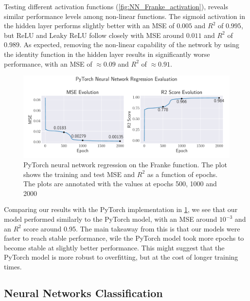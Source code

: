 \documentclass[aps,pra,english,notitlepage,reprint,nofootinbib]{revtex4-1}  %
\begin{document}
Testing different activation functions (\cref{fig:NN_Franke_activation}), reveals similar performance levels among non-linear functions. The sigmoid activation in the hidden layer performs slightly better with an MSE of $0.005$ and $R^2$ of $0.995$, but ReLU and Leaky ReLU follow closely with MSE around $0.011$ and $R^2$ of $0.989$. As expected, removing the non-linear capability of the network by using the identity function in the hidden layer results in significantly worse performance, with an MSE of $\approx 0.09$ and $R^2$ of $\approx0.91$. 

\onecolumngrid
\begin{figure}[h!]
    \centering
    \includegraphics[width = .9\textwidth]{../figs/nn_torch_franke.pdf}
    \caption{PyTorch neural network regression on the Franke function. The plot shows the training and test MSE and \( R^2 \) as a function of epochs. The plots are annotated with the values at epochs 500, 1000 and 2000}
    \label{fig:NN_Torch_scores}
\end{figure}
\twocolumngrid

Comparing our results with the PyTorch implementation in \cref{fig:NN_Torch_scores}, we see that our model performed similarly to the PyTorch model, with an MSE around \( 10^{-3} \) and an \( R^2 \) score around 0.95. The main takeaway from this is that our models were faster to reach stable performance, wile the PyTorch model took more epochs to become stable at slightly better performance. This might suggest that the PyTorch model is more robust to overfitting, but at the cost of longer training times.


\clearpage 

\subsection{Neural Networks Classification}
\end{document}
